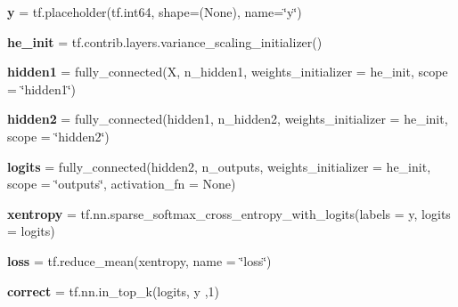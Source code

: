\begin{DoxyCompactItemize}
{\bfseries y} = tf.\+placeholder(tf.\+int64, shape=(None), name=\char`\"{}y\char`\"{})
\item 
\mbox{\label{namespacechemistry2quant_1_1chem2quant__NN_adaa42d9bfda5556d84893d20564a0587}} 
{\bfseries he\+\_\+init} = tf.\+contrib.\+layers.\+variance\+\_\+scaling\+\_\+initializer()
\item 
\mbox{\label{namespacechemistry2quant_1_1chem2quant__NN_a7c508a92b10b49d319dbaa4bf32f4603}} 
{\bfseries hidden1} = fully\+\_\+connected(X, n\+\_\+hidden1, weights\+\_\+initializer = he\+\_\+init, scope = \char`\"{}hidden1\char`\"{})
\item 
\mbox{\label{namespacechemistry2quant_1_1chem2quant__NN_ae5e03ae2343b49f236c2a942a5c8047c}} 
{\bfseries hidden2} = fully\+\_\+connected(hidden1, n\+\_\+hidden2, weights\+\_\+initializer = he\+\_\+init, scope = \char`\"{}hidden2\char`\"{})
\item 
\mbox{\label{namespacechemistry2quant_1_1chem2quant__NN_ab842ef6d43c1173baa2e074770117b1e}} 
{\bfseries logits} = fully\+\_\+connected(hidden2, n\+\_\+outputs, weights\+\_\+initializer = he\+\_\+init, scope = \char`\"{}outputs\char`\"{}, activation\+\_\+fn = None)
\item 
\mbox{\label{namespacechemistry2quant_1_1chem2quant__NN_a94a9ca4e3fb39656deba2044a94e5fd9}} 
{\bfseries xentropy} = tf.\+nn.\+sparse\+\_\+softmax\+\_\+cross\+\_\+entropy\+\_\+with\+\_\+logits(labels = y, logits = logits)
\item 
\mbox{\label{namespacechemistry2quant_1_1chem2quant__NN_a9a23dd52024165692c49df6102c996ce}} 
{\bfseries loss} = tf.\+reduce\+\_\+mean(xentropy, name = \char`\"{}loss\char`\"{})
\item 
\mbox{\label{namespacechemistry2quant_1_1chem2quant__NN_a4b3725ddf027f81477052fd33ce8e9a1}} 
{\bfseries correct} = tf.\+nn.\+in\+\_\+top\+\_\+k(logits, y ,1)
\item 
\mbox{\label{namespacechemistry2quant_1_1chem2quant__NN_ae9f1b8df536db132771bb8bc3c7430d3}} 

\end{DoxyCompactItemize}
